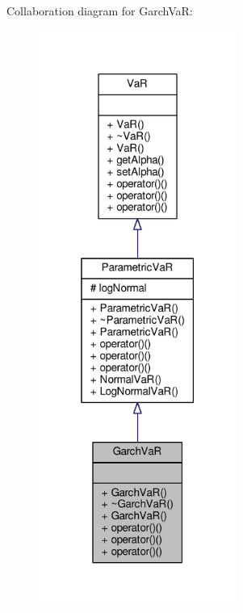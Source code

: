 Collaboration diagram for Garch\+VaR\+:
\nopagebreak
\begin{figure}[H]
\begin{center}
\leavevmode
\includegraphics[width=184pt]{classGarchVaR__coll__graph}
\end{center}
\end{figure}
